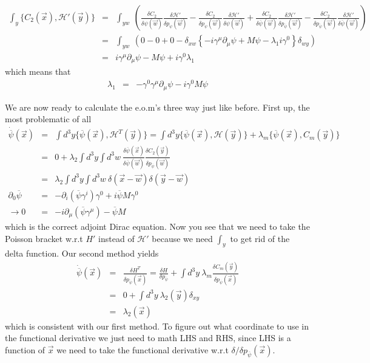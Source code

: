 \documentclass[aps,preprint,preprintnumbers,nofootinbib,showpacs,prd]{revtex4-1}
\newcommand{\nbea}{\begin{eqnarray*}}
\newcommand{\neea}{\end{eqnarray*}}
\begin{document}
%
\nbea
\int_y \{C_2(\vec x), \mathcal{H}'(\vec y) \} & = & \int_{yw}~ \left ( \frac{\delta C_2}{\delta \psi(\vec w)} \frac{\delta \mathcal{H}'}{\delta p_\psi(\vec w)} - \frac{\delta C_2}{\delta p_\psi(\vec w)} \frac{\delta \mathcal{H}'}{\delta \psi(\vec w)}  + \frac{\delta C_2}{\delta \overline \psi(\vec w)} \frac{\delta \mathcal{H}'}{\delta p_{\overline \psi}(\vec w)} - \frac{\delta C_2}{\delta p_{\overline\psi}(\vec w)} \frac{\delta \mathcal{H}'}{\delta \overline \psi(\vec w)} \right ) \\
& = & \int_{yw}~ \left ( 0 - 0 + 0 - \delta_{xw} \left \{ -i \gamma^\mu \partial_\mu \psi + M\psi - \lambda_1 i \gamma^0 \right \}\delta_{wy} \right ) \\
& = & i \gamma^\mu\partial_\mu \psi - M\psi + i \gamma^0 \lambda_1
\neea
%
which means that
%
\nbea
\lambda_1 & = & -\gamma^0\gamma^\mu\partial_\mu \psi - i \gamma^0 M\psi
\neea
%

We are now ready to calculate the e.o.m's three way just like before. First up, the most problematic of all
%
\nbea
\dot {\overline \psi}(\vec x) & = & \int d^3y \{\overline \psi(\vec x), \mathcal{H}^T(\vec y)\} =\int d^3y  \{\overline \psi(\vec x), \mathcal{H}(\vec y)\} + \lambda_m \{\overline \psi(\vec x), C_m(\vec y)\} \\
& = & 0 + \lambda_2 \int d^3y\int d^3w~\frac{\delta \overline \psi(\vec x)}{\delta \overline \psi(\vec w)} \frac{\delta C_2(\vec y)}{\delta p_{\overline \psi}(\vec w)}\\
& = & \lambda_2 \int d^3y\int d^3w~\delta(\vec x -\vec w) \delta(\vec y - \vec w)\\
\partial_0 \overline\psi & = & - \partial_{i}(\overline \psi \gamma^{i})\gamma^0 + i \overline \psi M \gamma^0 \\
\to 0 & = & -i \partial_{\mu}(\overline \psi \gamma^{\mu}) - \overline \psi M
\neea
%
which is the correct adjoint Dirac equation. Now you see that we need to take the Poisson bracket w.r.t $H'$ instead of $\mathcal{H}'$ because we need $\int_y$ to get rid of the delta function. Our second method yields
%
\nbea
\dot {\overline \psi}(\vec x) & = & \frac{\delta H^T}{\delta p_{\overline \psi}(\vec x)} = \frac{\delta H}{\delta p_{\overline \psi}} + \int d^3y~\lambda_m\frac{\delta C_m(\vec y)}{\delta p_{\overline \psi}(\vec x)} \\
& = & 0 + \int d^3y~\lambda_2(\vec y)\delta_{xy} \\
& = & \lambda_2(\vec x)
\neea
%
which is consistent with our first method. To figure out what coordinate to use in the functional derivative we just need to math LHS and RHS, since LHS is a function of $\vec x$ we need to take the functional derivative w.r.t $\delta/\delta p_{\overline \psi}(\vec x)$.
\end{document}
